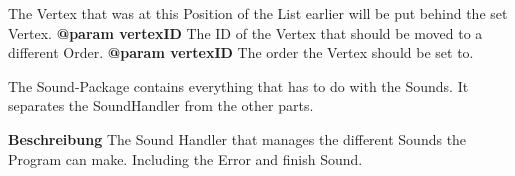 \begin{enumerate}[+]
{						The Vertex that was at this Position of the List earlier will be put behind the set Vertex.
						\newline
						\textbf{@param vertexID}
							The ID of the Vertex that should be moved to a different Order.
							\newline
						\textbf{@param vertexID}
							The order the Vertex should be set to.
							\newline
					}
				\end{enumerate}

	The Sound-Package contains everything that has to do with the Sounds.
	It separates the SoundHandler from the other parts.
	
			\textbf{Beschreibung}\newline
			The Sound Handler that manages the different Sounds the Program can make.
			Including the Error and finish Sound.
			
